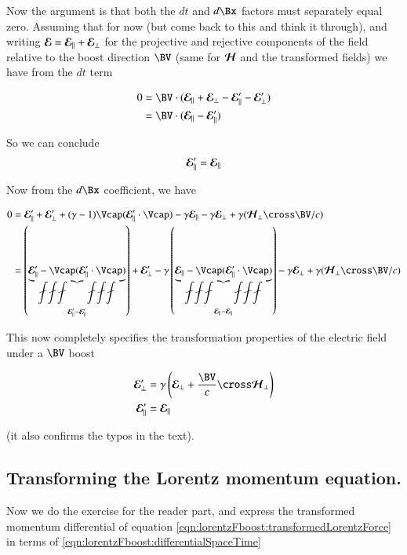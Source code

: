 Now the argument is that both the $dt$ and $d\Bx$ factors must separately equal zero.  
Assuming
that for now (but come back to this and think it through), and writing $\boldsymbol{\mathcal{E}} = \boldsymbol{\mathcal{E}}_\parallel + \boldsymbol{\mathcal{E}}_\perp$ for the projective
and rejective components of the field relative to the boost direction $\BV$ (same for $\boldsymbol{\mathcal{H}}$ and the transformed fields) we have from the $dt$ term

\begin{align*}
0 
&= \BV \cdot ( \EE_\parallel + \EE_\perp -\EE_\parallel' -\EE_\perp' ) \\
&= \BV \cdot ( \EE_\parallel -\EE_\parallel' ) \\
\end{align*}

So we can conclude
\begin{align*}
\boldsymbol{\mathcal{E}}_\parallel' =\boldsymbol{\mathcal{E}}_\parallel
\end{align*}

Now from the $d\Bx$ coefficient, we have

\begin{align*}
0 
&=
\EE_\parallel'
+\EE_\perp'
 + (\gamma-1) \Vcap (\EE_\parallel' \cdot \Vcap)
-\gamma \EE_\parallel
-\gamma \EE_\perp
+ \gamma (\HH_\perp \cross \BV/c) \\
&=
\left( \underbrace{\EE_\parallel' -\Vcap (\EE_\parallel' \cdot \Vcap)}_{\EE_\parallel' - \EE_\parallel'} \right)
+\EE_\perp'
-\gamma \left( \underbrace{\EE_\parallel - \Vcap (\EE_\parallel' \cdot \Vcap)}_{\EE_\parallel - \EE_\parallel} \right)
-\gamma \EE_\perp
+ \gamma (\HH_\perp \cross \BV/c) \\
\end{align*}

This now completely specifies the transformation properties of the electric field under a $\BV$ boost

\begin{align}\label{eqn:lorentzFboost:finalResultsForPower}
\EE_\perp' &= \gamma \left( \EE_\perp + \frac{\BV}{c} \cross \HH_\perp \right) \\
\EE_\parallel' &= \EE_\parallel
\end{align}

(it also confirms the typos in the text).

\subsection{Transforming the Lorentz momentum equation. }

Now we do the exercise for the reader part, and express the transformed momentum differential of equation
\ref{eqn:lorentzFboost:transformedLorentzForce} in terms of \ref{eqn:lorentzFboost:differentialSpaceTime}

